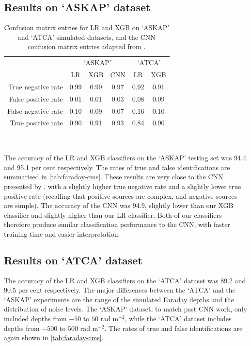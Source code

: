 \documentclass[11pt, a4paper]{book}
\begin{document}
  \subsection{Results on `ASKAP' dataset}
  \label{sec:faraday-cnn-comparison}

    \begin{table}[htbp]
      \caption{\label{tab:faraday-cms} Confusion matrix entries for LR and XGB on `ASKAP' and `ATCA' simulated datasets, and the CNN confusion matrix entries adapted from \citet{brown_classifying_2018}.}
      \centering
      \begin{tabular}{r|ccc|cc}
        \hline\hline
        & \multicolumn{3}{c}{`ASKAP'} & \multicolumn{2}{c}{`ATCA'} \\
        & LR & XGB & CNN & LR & XGB \\
        \hline
        True negative rate & 0.99 & 0.99 & 0.97 & 0.92 & 0.91\\
        False positive rate & 0.01 & 0.01 & 0.03 & 0.08 & 0.09\\
        False negative rate & 0.10 & 0.09 & 0.07 & 0.16 & 0.10\\
        True positive rate & 0.90 & 0.91 & 0.93 & 0.84 & 0.90\\
        \hline\hline
      \end{tabular}\\
    \end{table}

    The accuracy of the LR and XGB classifiers on the `ASKAP' testing set was 94.4 and 95.1 per cent respectively. The rates of true and false identifications are summarised in \autoref{tab:faraday-cms}. These results are very close to the CNN presented by \citet{brown_classifying_2018}, with a slightly higher true negative rate and a slightly lower true positive rate (recalling that positive sources are complex, and negative sources are simple). The accuracy of the CNN was 94.9, slightly lower than our XGB classifier and slightly higher than our LR classifier. Both of our classifiers therefore produce similar classification performance to the CNN, with faster training time and easier interpretation.

  \subsection{Results on `ATCA' dataset}
  \label{sec:faraday-results-simulated}

    The accuracy of the LR and XGB classifiers on the `ATCA' dataset was 89.2 and 90.5 per cent respectively. The major differences between the `ATCA' and the `ASKAP' experiments are the range of the simulated Faraday depths and the distribution of noise levels. The `ASKAP' dataset, to match past CNN work, only included depths from $-50$ to $50$ rad m$^{-2}$, while the `ATCA' dataset includes depths from $-500$ to $500$ rad m$^{-2}$. The rates of true and false identifications are again shown in \autoref{tab:faraday-cms}.
\end{document}
